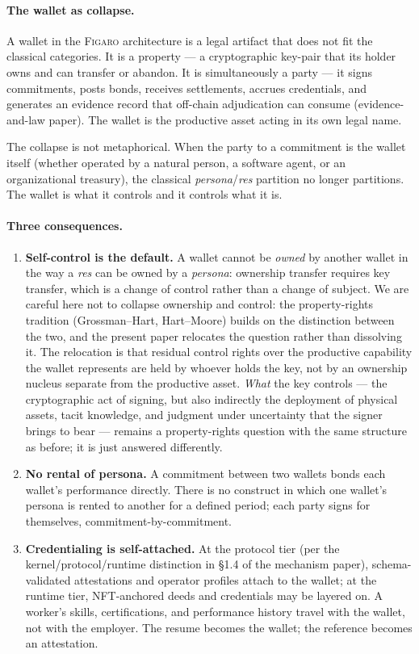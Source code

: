 \documentclass[11pt,a4paper]{article}
\theoremstyle{remark}
\newcommand{\figaro}{\textsc{Figaro}}
\begin{document}
\paragraph{The wallet as collapse.}
A wallet in the \figaro{} architecture is a legal artifact that
does not fit the classical categories. It is a property --- a
cryptographic key-pair that its holder owns and can transfer or
abandon. It is simultaneously a party --- it signs commitments,
posts bonds, receives settlements, accrues credentials, and
generates an evidence record that off-chain adjudication can
consume (evidence-and-law paper). The wallet is the productive
asset acting in its own legal name.

The collapse is not metaphorical. When the party to a commitment
is the wallet itself (whether operated by a natural person, a
software agent, or an organizational treasury), the classical
\emph{persona}/\emph{res} partition no longer partitions. The
wallet is what it controls and it controls what it is.

\paragraph{Three consequences.}
\begin{enumerate}[label=(\alph*)]
  \item \textbf{Self-control is the default.} A wallet cannot be
    \emph{owned} by another wallet in the way a \emph{res} can be
    owned by a \emph{persona}: ownership transfer requires key
    transfer, which is a change of control rather than a change of
    subject. We are careful here not to collapse ownership and
    control: the property-rights tradition (Grossman--Hart, Hart--Moore)
    builds on the distinction between the two, and the present
    paper relocates the question rather than dissolving it. The
    relocation is that residual control rights over the productive
    capability the wallet represents are held by whoever holds the
    key, not by an ownership nucleus separate from the productive
    asset. \emph{What} the key controls --- the cryptographic act
    of signing, but also indirectly the deployment of physical
    assets, tacit knowledge, and judgment under uncertainty that
    the signer brings to bear --- remains a property-rights
    question with the same structure as before; it is just answered
    differently.
  \item \textbf{No rental of persona.} A commitment between two
    wallets bonds each wallet's performance directly. There is no
    construct in which one wallet's persona is rented to another
    for a defined period; each party signs for themselves,
    commitment-by-commitment.
  \item \textbf{Credentialing is self-attached.} At the protocol
    tier (per the kernel/protocol/runtime distinction
    in §1.4 of the mechanism paper), schema-validated
    attestations and operator profiles attach to the wallet; at
    the runtime tier, NFT-anchored deeds and credentials may be
    layered on. A worker's skills, certifications, and
    performance history travel with the wallet, not with the
    employer. The resume becomes the wallet; the reference becomes
    an attestation.
\end{enumerate}
\end{document}
